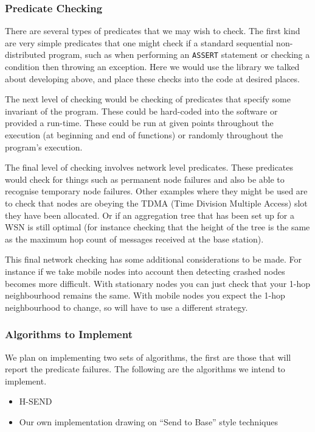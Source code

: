 \documentclass[a4paper]{article}
\begin{document}
\subsubsection{Predicate Checking}

There are several types of predicates that we may wish to check. The first kind
are very simple predicates that one might check if a standard sequential
non-distributed program, such as when performing an \verb|ASSERT| statement or
checking a condition then throwing an exception. Here we would use the library
we talked about developing above, and place these checks into the code at
desired places.

The next level of checking would be checking of predicates that specify some
invariant of the program. These could be hard-coded into the software or
provided a run-time. These could be run at given points throughout the execution
(at beginning and end of functions) or randomly throughout the program's
execution.

The final level of checking involves network level predicates. These predicates
would check for things such as permanent node failures and also be able to
recognise temporary node failures. Other examples where they might be used are
to check that nodes are obeying the TDMA (Time Division Multiple Access) slot
they have been allocated. Or if an aggregation tree \cite{TankBible} that has
been set up for a WSN is still optimal (for instance checking that the height of
the tree is the same as the maximum hop count of messages received at the base
station).

This final network checking has some additional considerations to be made. For
instance if we take mobile nodes into account then detecting crashed nodes
becomes more difficult. With stationary nodes you can just check that your 1-hop
neighbourhood remains the same. With mobile nodes you expect the 1-hop
neighbourhood to change, so will have to use a different strategy.


\subsubsection{Algorithms to Implement}

We plan on implementing two sets of algorithms, the first are those that will
report the predicate failures. The following are the algorithms we intend to
implement.

\begin{itemize}
	\item H-SEND \cite{herbert2007adaptive}
	\item Our own implementation drawing on ``Send to Base'' style
techniques \cite{?}
\end{itemize}
\end{document}
